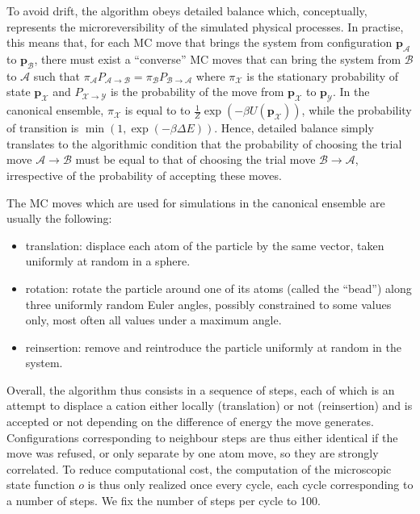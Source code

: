\documentclass[main.tex]{subfiles}
\begin{document}
To avoid drift, the algorithm obeys detailed balance which, conceptually, represents the microreversibility of the simulated physical processes. In practise, this means that, for each MC move that brings the system from configuration ${\boldsymbol p}_\mathcal{A}$ to ${\boldsymbol p}_\mathcal{B}$, there must exist a ``converse'' MC moves that can bring the system from $\mathcal{B}$ to $\mathcal{A}$ such that $\pi_\mathcal{A} P_{\mathcal{A}\to \mathcal{B}} = \pi_\mathcal{B} P_{\mathcal{B}\to \mathcal{A}}$ where $\pi_\mathcal{X}$ is the stationary probability of state ${\boldsymbol p}_\mathcal{X}$ and $P_{\mathcal{X}\to \mathcal{Y}}$ is the probability of the move from ${\boldsymbol p}_\mathcal{X}$ to ${\boldsymbol p}_\mathcal{Y}$. In the canonical ensemble, $\pi_\mathcal{X}$ is equal to to $\frac1Z\exp\left(-\beta U\left({\boldsymbol p}_\mathcal{X}\right)\right)$, while the probability of transition is $\min\left(1, \exp\left(-\beta \Delta E\right)\right)$. Hence, detailed balance simply translates to the algorithmic condition that the probability of choosing the trial move $\mathcal{A}\to \mathcal{B}$ must be equal to that of choosing the trial move $\mathcal{B}\to \mathcal{A}$, irrespective of the probability of accepting these moves.

The MC moves which are used for simulations in the canonical ensemble are usually the following:
\begin{itemize}
    \item translation: displace each atom of the particle by the same vector, taken uniformly at random in a sphere.
    \item rotation: rotate the particle around one of its atoms (called the ``bead'') along three uniformly random Euler angles, possibly constrained to some values only, most often all values under a maximum angle.
    \item reinsertion: remove and reintroduce the particle uniformly at random in the system.
\end{itemize}

Overall, the algorithm thus consists in a sequence of steps, each of which is an attempt to displace a cation either locally (translation) or not (reinsertion) and is accepted or not depending on the difference of energy the move generates. Configurations corresponding to neighbour steps are thus either identical if the move was refused, or only separate by one atom move, so they are strongly correlated. To reduce computational cost, the computation of the microscopic state function $o$ is thus only realized once every cycle, each cycle corresponding to a number of steps. We fix the number of steps per cycle to 100.
\end{document}
